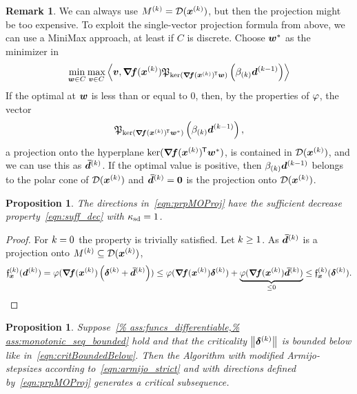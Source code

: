 \documentclass{article}
\theoremstyle{plain}
\newtheorem{proposition}[theorem]{Proposition}
\theoremstyle{definition}
\newtheorem*{remark*}{Remark}
\begin{document}
\begin{remark*}
We can always use $M^{(k)} = \mathcal D(\bm{x}^{(k)})$, but then the projection
might be too expensive.
To exploit the single-vector projection formula from above, 
we can use a MiniMax approach, at least if $C$ is discrete.
Choose $\bm{w}^*$ as the minimizer in
$$
\min_{\bm{w}\in C}
\max_{\bm{v}\in C}
\left\langle 
	\bm{v}, 
	\bm{\nabla}\!\bm{f}(\bm{x}^{(k)})\mathfrak P_{\operatorname*{ker}(\bm{\nabla}\!\bm{f}(\bm{x}^{(k)})^{\mkern-1.5mu\mathsf{T}}\bm{w})}\left(\beta_{(k)} \bm{d}^{(k-1)}\right)
 \right\rangle
$$
If the optimal at $\bm{w}$ is less than or equal to $0$,
then, by the properties of $\varphi$, the vector
$$
\mathfrak P_{\operatorname*{ker}(\bm{\nabla}\!\bm{f}(\bm{x}^{(k)})^{\mkern-1.5mu\mathsf{T}}\bm{w}^*)}\left(\beta_{(k)} \bm{d}^{(k-1)}\right),
$$
a projection onto the hyperplane $\operatorname*{ker}(\bm{\nabla}\!\bm{f}(\bm{x}^{(k)})^{\mkern-1.5mu\mathsf{T}}\bm{w}^*)$,
is contained in $\mathcal D(\bm{x}^{(k)})$, and
we can use this as $\bm{\bar{d}}^{(k)}$.
If the optimal value is positive, then $\beta_{(k)}\bm{d}^{(k-1)}$ belongs to
the polar cone of $\mathcal D(\bm{x}^{(k)})$ and $\bm{\bar{d}}^{(k)} = \bm{0}$
is the projection onto $\mathcal D(\bm{x}^{(k)})$.
\end{remark*}

\begin{proposition}
The directions in~\eqref{eqn:prpMOProj} have the 
sufficient decrease property~\eqref{eqn:suff_dec}
with $\kappa_{\mathrm{sd}} = 1$.
\end{proposition}
\begin{proof}
For $k=0$ the property is trivially satisfied.
Let $k\geq 1$.
As $\bm{\bar{d}}^{(k)}$ is a projection onto $M^{(k)}\subseteq \mathcal D(\bm{x}^{(k)})$,
\begin{align*}
	\mathfrak{f}_{\bm{x}}^{(k)}(\bm{d}^{(k)})
	=
	\varphi(\bm{\nabla}\!\bm{f}(\bm{x}^{(k)})\left(\bm{\delta}^{(k)} + \bm{\bar{d}}^{(k)}\right))
	\leq
	\varphi(\bm{\nabla}\!\bm{f}(\bm{x}^{(k)})\bm{\delta}^{(k)})
	+ 
	\underbrace{\varphi(\bm{\nabla}\!\bm{f}(\bm{x}^{(k)})\bm{\bar{d}}^{(k)})}_{\leq 0}
	\leq 
	\mathfrak{f}_{\bm{x}}^{(k)}(\bm{\delta}^{(k)}).
\end{align*}
\end{proof}

\begin{proposition}
	Suppose~\cref{%
	ass:funcs_differentiable,%
	ass:monotonic_seq_bounded}
	hold and that the criticality $\left\|\bm{\delta}^{(k)}\right\|$ is 
	bounded below like in~\eqref{eqn:critBoundedBelow}.
	Then the Algorithm with modified Armijo-stepsizes
	according to~\eqref{eqn:armijo_strict} and with directions defined
	by~\eqref{eqn:prpMOProj} generates a critical subsequence.
\end{proposition}
\end{document}
